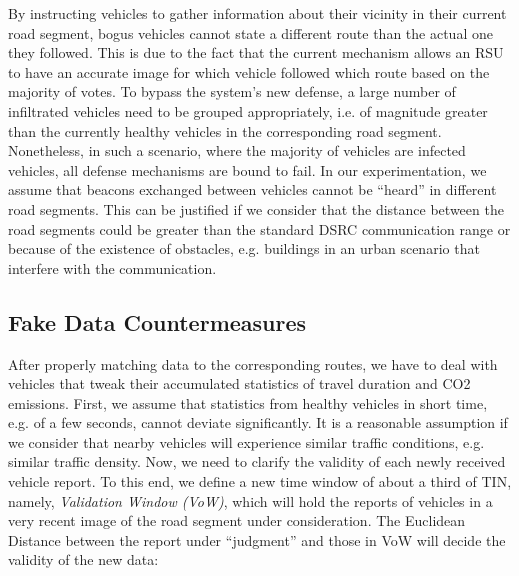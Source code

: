 \documentclass[conference]{IEEEtran}
\begin{document}
By instructing vehicles to gather information about their vicinity in their current road segment, bogus vehicles cannot state a different route than the actual one 
they followed. This is due to the fact that the current mechanism allows an RSU to have an accurate image for which vehicle followed which route based on the majority 
of votes. To bypass the system's new defense,  a large number of infiltrated vehicles need to be grouped appropriately, i.e. of magnitude greater than
the currently healthy vehicles in the corresponding road segment. Nonetheless, in such a scenario, where the majority of vehicles are infected vehicles,
all defense mechanisms are bound to fail.  In our experimentation, we assume that beacons exchanged between vehicles cannot be ``heard'' in different road 
segments. This can be justified if we consider that the distance between the road segments could be greater than the standard DSRC communication range or because of the existence of obstacles, e.g. buildings in an urban scenario that interfere with the communication.  
 

\begin{comment}
\begin{figure}[!htb]
  \centering
     \texttt{[image: ErouVe\_Diagram.pdf]}
  \caption{caption}
  \label{erouve_diagram}
\end{figure}
\end{comment}








\subsection{Fake Data Countermeasures}

After properly matching data to the corresponding routes, we have to deal with vehicles that tweak their accumulated statistics of travel duration 
and CO2 emissions. First, we assume that statistics from healthy vehicles in short time, e.g. of a few seconds, cannot deviate significantly. It is a reasonable assumption 
if we consider that nearby vehicles will experience similar traffic conditions, e.g. similar traffic density. Now, we need to clarify the validity of each newly received vehicle report.
To this end, we define a new time window of about a third of TIN, namely, {\it Validation Window (VoW)}, which will hold the reports of vehicles in a very recent image of  
the road segment under consideration. The Euclidean Distance between the report under ``judgment'' and those in VoW will decide the validity of the new data:
\end{document}
